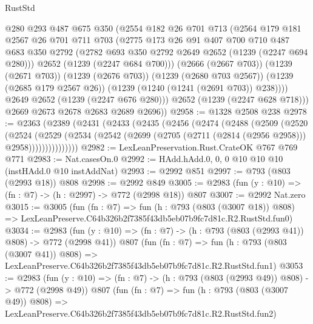 \begin{lexlean}{RustStd}
\begin{coremodule}
            @280
            @293
            @487
            @675
            @350
            (@2554
              @182
              @26
              @701
              @713
              (@2564
                @179
                @181
                @2567
                @26
                @701
                @711
                @703
                (@2775
                  @173
                  @26
                  @91
                  @407
                  @700
                  @710
                  @487
                  @683
                  @350
                  @2792
                  (@2782 @693 @350 @2792 @2649 @2652 (@1239 (@2247 @694 @280)))
                  @2652
                  (@1239 (@2247 @684 @700)))
                (@2666 (@2667 @703))
                (@1239 (@2671 @703))
                (@1239 (@2676 @703))
                (@1239 (@2680 @703 @2567))
                (@1239 (@2685 @179 @2567 @26))
                (@1239 (@1240 (@1241 (@2691 @703)) @238))))
            @2649
            @2652
            (@1239 (@2247 @676 @280)))
          @2652
          (@1239 (@2247 @628 @718)))
        @2669
        @2673
        @2678
        @2683
        @2689
        @2696))
@2958 := @1328 @2508 @238
@2978 := @2363
    (@2389
      (@2431
        (@2433
          (@2435
            (@2456
              (@2474
                (@2488
                  (@2509
                    (@2520
                      (@2524
                        (@2529
                          (@2534
                            (@2542 (@2699 (@2705 (@2711 (@2814 (@2956 @2958))) @2958)))))))))))))))
@2982 := LexLeanPreservation.Rust.CrateOK @767 @769 @771
@2983 := Nat.casesOn.{0}
@2992 := HAdd.hAdd.{0, 0, 0} @10 @10 @10 (instHAdd.{0} @10 instAddNat)
@2993 := @2992 @851
@2997 := @793 (@803 (@2993 @18)) @808
@2998 := @2992 @849
@3005 := @2983 (fun (y : @10) => (fn : @7) -> (h : @2997) -> @772 (@2998 @18)) @807
@3007 := @2992 Nat.zero
@3015 := @3005
    (fun (fn : @7) =>
    fun (h : @793 (@803 (@3007 @18)) @808) =>
    LexLeanPreserve.C64b326b2f7385f43db5eb07b9fc7d81c.R2.RustStd.fun0)
@3034 := @2983
    (fun (y : @10) => (fn : @7) -> (h : @793 (@803 (@2993 @41)) @808) -> @772 (@2998 @41))
    @807
    (fun (fn : @7) =>
    fun (h : @793 (@803 (@3007 @41)) @808) =>
    LexLeanPreserve.C64b326b2f7385f43db5eb07b9fc7d81c.R2.RustStd.fun1)
@3053 := @2983
    (fun (y : @10) => (fn : @7) -> (h : @793 (@803 (@2993 @49)) @808) -> @772 (@2998 @49))
    @807
    (fun (fn : @7) =>
    fun (h : @793 (@803 (@3007 @49)) @808) =>
    LexLeanPreserve.C64b326b2f7385f43db5eb07b9fc7d81c.R2.RustStd.fun2)

\end{coremodule}
\end{lexlean}
